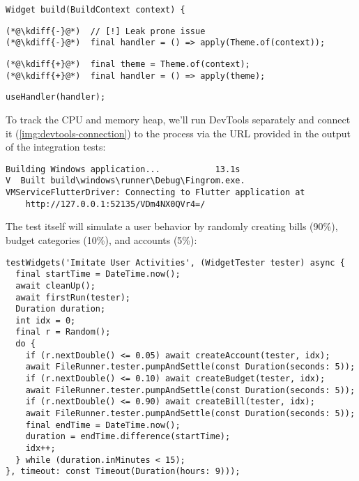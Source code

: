 \begin{lstlisting}
Widget build(BuildContext context) {
\end{lstlisting}
{
\xpretocmd{\lstlisting}{\vspace{-12pt}}{}{}
\begin{lstlisting}[firstnumber=2, backgroundcolor=\color{backred}]
(*@\kdiff{-}@*)  // [!] Leak prone issue
(*@\kdiff{-}@*)  final handler = () => apply(Theme.of(context));
\end{lstlisting}
\begin{lstlisting}[firstnumber=2, backgroundcolor=\color{backgreen}]
(*@\kdiff{+}@*)  final theme = Theme.of(context);
(*@\kdiff{+}@*)  final handler = () => apply(theme);
\end{lstlisting}
\begin{lstlisting}[firstnumber=4]
   useHandler(handler);
\end{lstlisting}
}


\noindent To track the CPU and memory heap, we'll run DevTools separately and connect it 
(\cref{img:devtools-connection}) to the process via the URL provided in the output of the integration tests:

\begin{lstlisting}[language=terminal]
Building Windows application...           13.1s
V  Built build\windows\runner\Debug\Fingrom.exe.
VMServiceFlutterDriver: Connecting to Flutter application at 
    http://127.0.0.1:52135/VDm4NX0QVr4=/
\end{lstlisting}

\noindent The test itself will simulate a user behavior by randomly creating bills (90\%), budget categories (10\%), 
and accounts (5\%): 

\begin{lstlisting}
testWidgets('Imitate User Activities', (WidgetTester tester) async {
  final startTime = DateTime.now();
  await cleanUp();
  await firstRun(tester);
  Duration duration;
  int idx = 0;
  final r = Random();
  do {
    if (r.nextDouble() <= 0.05) await createAccount(tester, idx);
    await FileRunner.tester.pumpAndSettle(const Duration(seconds: 5));
    if (r.nextDouble() <= 0.10) await createBudget(tester, idx);
    await FileRunner.tester.pumpAndSettle(const Duration(seconds: 5));
    if (r.nextDouble() <= 0.90) await createBill(tester, idx);
    await FileRunner.tester.pumpAndSettle(const Duration(seconds: 5));
    final endTime = DateTime.now();
    duration = endTime.difference(startTime);
    idx++;
  } while (duration.inMinutes < 15);
}, timeout: const Timeout(Duration(hours: 9)));
\end{lstlisting}

